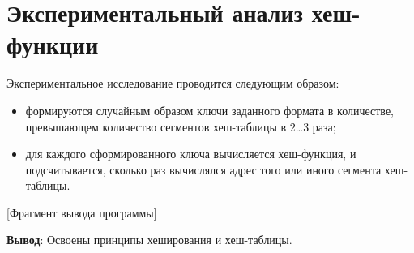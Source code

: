 \documentclass[variant=labwork]{bsuir}
\begin{document}
\section*{Экспериментальный анализ хеш-функции}

Экспериментальное исследование проводится следующим образом:

\begin{itemize}
    \item формируются случайным образом ключи заданного формата в количестве,
          превышающем количество сегментов хеш-таблицы в 2\ldots 3 раза;
    \item для каждого сформированного ключа вычисляется хеш-функция, и
          подсчитывается, сколько раз вычислялся адрес того или иного сегмента
          хеш-таблицы.
\end{itemize}


[Фрагмент вывода программы]

\textbf{Вывод}: Освоены принципы хеширования и хеш-таблицы.
\end{document}
